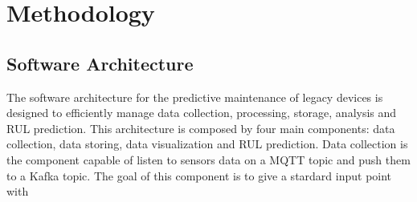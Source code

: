 \chapter{Methodology}
\label{cha:789}

\section{Software Architecture}

The software architecture for the predictive maintenance of legacy devices is designed to efficiently manage data collection, processing, storage, analysis and RUL prediction. This architecture is composed by four main components: data collection, data storing, data visualization and RUL prediction.
Data collection is the component capable of listen to sensors data on a MQTT topic and push them to a Kafka topic. The goal of this component is to give a stardard input point with  

